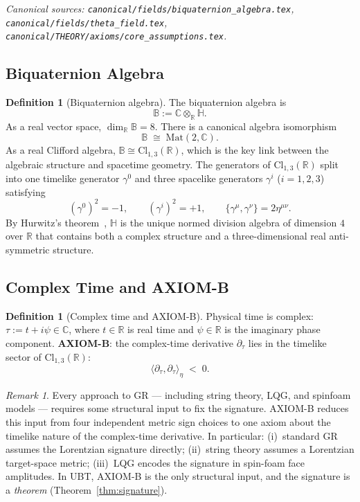 \documentclass[12pt,a4paper]{article}
\theoremstyle{definition}
\newtheorem{definition}[theorem]{Definition}
\theoremstyle{remark}
\newtheorem{remark}[theorem]{Remark}
\newcommand{\BB}{\mathbb{B}}
\newcommand{\CC}{\mathbb{C}}
\newcommand{\RR}{\mathbb{R}}
\newcommand{\HH}{\mathbb{H}}
\begin{document}
\noindent\textit{Canonical sources: \texttt{canonical/fields/biquaternion\_algebra.tex},
\texttt{canonical/fields/theta\_field.tex},
\texttt{canonical/THEORY/axioms/core\_assumptions.tex}.}

\subsection{Biquaternion Algebra}

\begin{definition}[Biquaternion algebra]
\label{def:biquaternion}
The biquaternion algebra is
\[
  \BB := \CC\otimes_\RR\HH.
\]
As a real vector space, $\dim_\RR\BB = 8$.
There is a canonical algebra isomorphism
\[
  \BB \;\cong\; \mathrm{Mat}(2,\CC).
\]
As a real Clifford algebra,
$\BB \cong \mathrm{Cl}_{1,3}(\RR)$,
which is the key link between the algebraic structure and spacetime geometry.
The generators of $\mathrm{Cl}_{1,3}(\RR)$ split into one timelike generator
$\gamma^0$ and three spacelike generators $\gamma^i$ ($i = 1,2,3$) satisfying
\[
  (\gamma^0)^2 = -1, \qquad
  (\gamma^i)^2 = +1, \qquad
  \{\gamma^\mu, \gamma^\nu\} = 2\eta^{\mu\nu}.
\]
By Hurwitz's theorem~\cite{hurwitz1923}, $\HH$ is the unique normed division
algebra of dimension $4$ over $\RR$ that contains both a complex structure
and a three-dimensional real anti-symmetric structure.
\end{definition}

\subsection{Complex Time and AXIOM-B}

\begin{definition}[Complex time and AXIOM-B]
\label{def:axiomb}
Physical time is complex: $\tau := t + i\psi \in \CC$,
where $t \in \RR$ is real time and $\psi \in \RR$ is the imaginary phase component.
\textbf{AXIOM-B}: the complex-time derivative $\partial_\tau$ lies in the
timelike sector of $\mathrm{Cl}_{1,3}(\RR)$:
\[
  \langle\partial_\tau,\partial_\tau\rangle_\eta \;<\; 0.
\]
\end{definition}

\begin{remark}
Every approach to GR — including string theory, LQG, and spinfoam models —
requires some structural input to fix the signature.
AXIOM-B reduces this input from four independent metric sign choices to one
axiom about the timelike nature of the complex-time derivative.
In particular:
(i)~standard GR assumes the Lorentzian signature directly;
(ii)~string theory assumes a Lorentzian target-space metric;
(iii)~LQG encodes the signature in spin-foam face amplitudes.
In UBT, AXIOM-B is the only structural input, and the signature is a
\emph{theorem} (Theorem~\ref{thm:signature}).
\end{remark}
\end{document}
